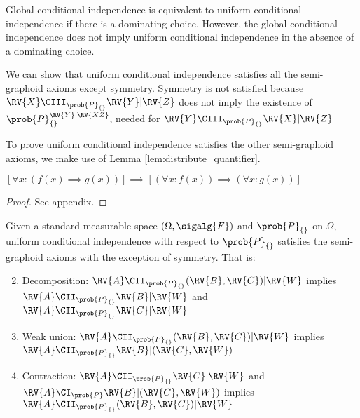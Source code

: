 Global conditional independence is equivalent to uniform conditional independence if there is a dominating choice. However, the global conditional independence does not imply uniform conditional independence in the absence of a dominating choice.

We can show that uniform conditional independence satisfies all the semi-graphoid axioms except symmetry. Symmetry is not satisfied because $\RV{X}\CIII_{\prob{P}_{\{\}}}\RV{Y}|\RV{Z}$ does not imply the existence of $\prob{P}_{\{\}}^{\RV{Y}|\RV{XZ}}$, needed for $\RV{Y}\CIII_{\prob{P}_{\{\}}}\RV{X}|\RV{Z}$

To prove uniform conditional independence satisfies the other semi-graphoid axioms, we make use of Lemma \ref{lem:distribute_quantifier}.

\begin{lemma}\label{lem:distribute_quantifier}
$[\forall x: (f(x)\implies g(x))]\implies[(\forall x: f(x))\implies(\forall x: g(x))]$
\end{lemma}

\begin{proof}
See appendix.
\end{proof}

\begin{theorem}
Given a standard measurable space $(\Omega,\sigalg{F})$ and $\prob{P}_{\{\}}$ on $\Omega$, uniform conditional independence with respect to $\prob{P}_{\{\}}$ satisfies the semi-graphoid axioms with the exception of symmetry. That is:

\begin{enumerate}
    \setcounter{enumi}{1}
    \item Decomposition: $\RV{A}\CII_{\prob{P}_{\{\}}} (\RV{B},\RV{C})|\RV{W}$ implies $\RV{A}\CII_{\prob{P}_{\{\}}}\RV{B}|\RV{W}$ and $\RV{A}\CII_{\prob{P}_{\{\}}}\RV{C}|\RV{W}$
    \item Weak union: $\RV{A}\CII_{\prob{P}_{\{\}}}(\RV{B},\RV{C})|\RV{W}$ implies $\RV{A}\CII_{\prob{P}_{\{\}}}\RV{B}|(\RV{C},\RV{W})$
    \item Contraction: $\RV{A}\CII_{\prob{P}_{\{\}}}\RV{C}|\RV{W}$ and $\RV{A}\CI_{\prob{P}}\RV{B}|(\RV{C},\RV{W})$ implies $\RV{A}\CII_{\prob{P}_{\{\}}}(\RV{B},\RV{C})|\RV{W}$
\end{enumerate}
\end{theorem}

